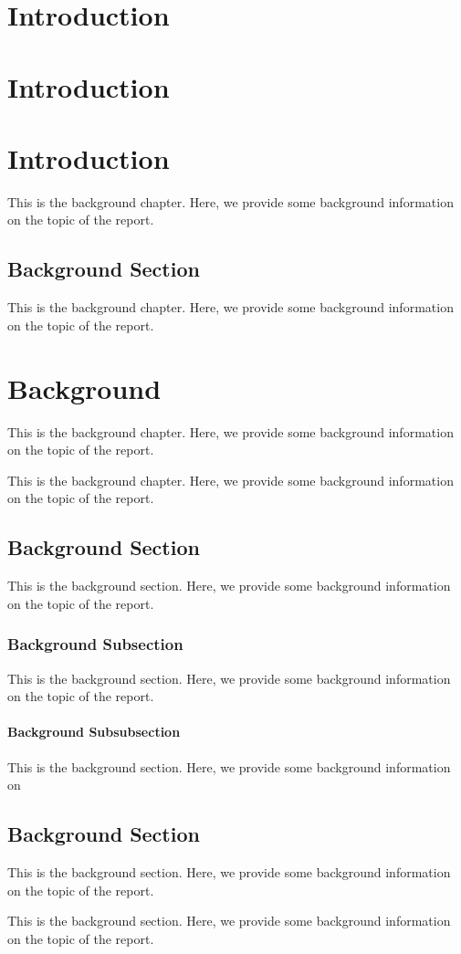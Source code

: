 \documentclass{report}
\begin{document}
\chapter{Introduction}
\chapter{Introduction}

\chapter{Introduction}
This is the background chapter. Here, we provide some background information on
the topic of the report.
\section{Background Section}

This is the background chapter. Here, we provide some background information on
the topic of the report.
\chapter{Background}
This is the background chapter. Here, we provide some background information on
the topic of the report.

This is the background chapter. Here, we provide some background information on
the topic of the report.

\section{Background Section}
This is the background section. Here, we provide some background information on
the topic of the report.

\subsection{Background Subsection}

This is the background section. Here, we provide some background information on
the topic of the report.
\subsubsection{Background Subsubsection}
This is the background section. Here, we provide some background information on
\section{Background Section}
This is the background section. Here, we provide some background information on
the topic of the report.

This is the background section. Here, we provide some background information on
the topic of the report.
\end{document}
